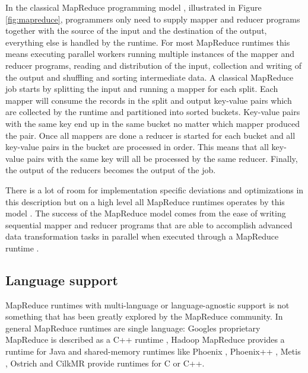 \documentclass[twocolumn,11px]{article}       %
\begin{document}
In the classical MapReduce programming model \cite{GoogleMapReduce}, illustrated
in Figure \ref{fig:mapreduce}, programmers only need to supply mapper and
reducer programs together with the source of the input and the destination of
the output, everything else is handled by the runtime. For most MapReduce
runtimes this means executing parallel workers running multiple instances of the
mapper and reducer programs, reading and distribution of the input, collection
and writing of the output and shuffling and sorting intermediate data. A
classical MapReduce job starts by splitting the input and running a mapper for
each split. Each mapper will consume the records in the split and output
key-value pairs which are collected by the runtime and partitioned into sorted
buckets. Key-value pairs with the same key end up in the same bucket no matter
which mapper produced the pair. Once all mappers are done a reducer is started
for each bucket and all key-value pairs in the bucket are processed in order.
This means that all key-value pairs with the same key will all be processed by
the same reducer. Finally, the output of the reducers becomes the output of the
job.

There is a lot of room for implementation specific deviations and optimizations
in this description but on a high level all MapReduce runtimes operates by this
model \cite{GoogleMapReduce} \cite{Hadoop} \cite{Phoenix} \cite{Phoenix++}
\cite{CilkMR} \cite{Metis} \cite{Ostrich}. The success of the MapReduce model
comes from the ease of writing sequential mapper and reducer programs that are
able to accomplish advanced data transformation tasks in parallel when executed
through a MapReduce runtime \cite{GoogleMapReduce}.

\subsection{Language support}

MapReduce runtimes with multi-language or language-agnostic support is not
something that has been greatly explored by the MapReduce community. In general
MapReduce runtimes are single language: Googles proprietary MapReduce is
described as a C++ runtime \cite{GoogleMapReduce}, Hadoop MapReduce provides a
runtime for Java \cite{Hadoop} and shared-memory runtimes like Phoenix
\cite{Phoenix}, Phoenix++ \cite{Phoenix++}, Metis \cite{Metis}, Ostrich
\cite{Ostrich} and CilkMR \cite{CilkMR} provide runtimes for C or C++.
\end{document}
